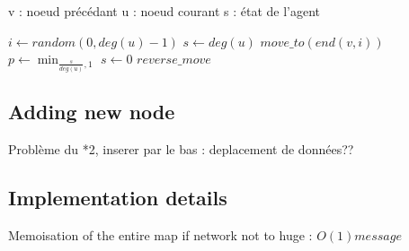 \begin{algorithmic}
    \State v : noeud précédant
    \State u : noeud courant
    \State s : état de l'agent

    \State $i\gets random(0, deg(u)-1)$
    \State $s \gets deg(u)$
    \State $move\_to( end(v,i) )$
       \Else
    \State $p \gets \min_{ \frac{s}{deg(u)}, 1}$
      \State $s \gets 0$
    \Else
      \State $reverse\_move$
    \EndIf
      \EndIf
 \end{algorithmic}


\subsection{Adding new node}
Problème du *2, inserer par le bas : deplacement de données??

\subsection{Implementation details}
Memoisation of the entire map if network not to huge : $O(1) message$